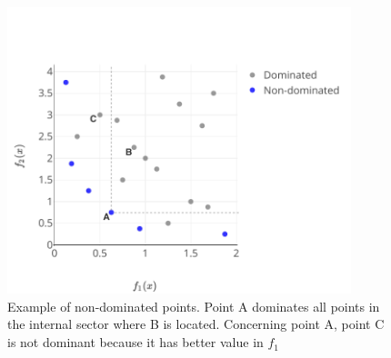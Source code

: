         \begin{figure}
            \centering 
            \includegraphics[width=10cm]{content/images/ndom}
            \caption[Non-dominated points]{Example of non-dominated points. Point A dominates all points in the internal sector where B is located. Concerning point A, point C is not dominant because it has better value in $f_1$} 
            \label{fig:dominated} 
        \end{figure}




